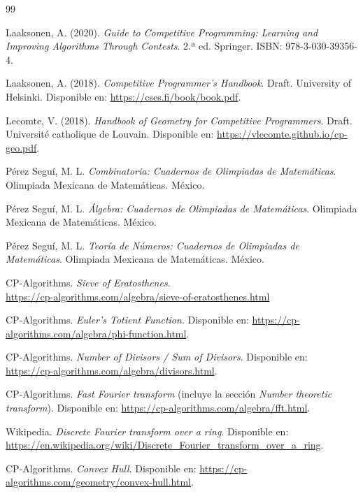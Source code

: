 \begin{thebibliography}{99}

Laaksonen, A. (2020). \textit{Guide to Competitive Programming: 
Learning and Improving Algorithms Through Contests}. 
2.ª ed. Springer. 
ISBN: 978-3-030-39356-4.

Laaksonen, A. (2018). \textit{Competitive Programmer's Handbook}. 
Draft. University of Helsinki.
Disponible en: \url{https://cses.fi/book/book.pdf}.

Lecomte, V. (2018). \textit{Handbook of Geometry for Competitive Programmers}. 
Draft. Université catholique de Louvain.
Disponible en: \url{https://vlecomte.github.io/cp-geo.pdf}.

Pérez Seguí, M. L. \textit{Combinatoria: Cuadernos de Olimpiadas de Matemáticas}. 
Olimpiada Mexicana de Matemáticas. México.

Pérez Seguí, M. L. \textit{Álgebra: Cuadernos de Olimpiadas de Matemáticas}. 
Olimpiada Mexicana de Matemáticas. México.

Pérez Seguí, M. L. \textit{Teoría de Números: Cuadernos de Olimpiadas de Matemáticas}. 
Olimpiada Mexicana de Matemáticas. México.

CP-Algorithms. \emph{Sieve of Eratosthenes}.\\
\url{https://cp-algorithms.com/algebra/sieve-of-eratosthenes.html}

CP-Algorithms. \textit{Euler's Totient Function}.
Disponible en: \url{https://cp-algorithms.com/algebra/phi-function.html}.

CP-Algorithms. \textit{Number of Divisors / Sum of Divisors}.
Disponible en: \url{https://cp-algorithms.com/algebra/divisors.html}.

CP-Algorithms. \textit{Fast Fourier transform} (incluye la sección \textit{Number theoretic transform}).
Disponible en: \url{https://cp-algorithms.com/algebra/fft.html}.

Wikipedia. \textit{Discrete Fourier transform over a ring}.
Disponible en: \url{https://en.wikipedia.org/wiki/Discrete_Fourier_transform_over_a_ring}.

CP-Algorithms. \textit{Convex Hull}.
Disponible en: \url{https://cp-algorithms.com/geometry/convex-hull.html}.


\end{thebibliography}
